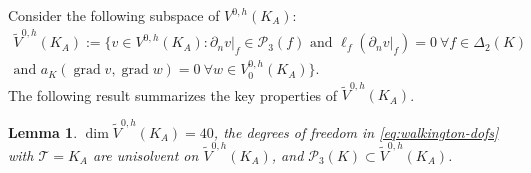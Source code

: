 \documentclass{mcom-l}
\newtheorem{lemma}[theorem]{Lemma}
\theoremstyle{definition}
\theoremstyle{remark}
\numberwithin{equation}{section}
\DeclareMathOperator{\grad}{grad}
\newcommand{\mesh}[0]{\mathcal{T}}
\begin{document}
Consider the following subspace of $V^{0, h}(K_A)$:
\begin{multline}
	\label{eq:local-h2-space-def}
	\tilde{V}^{0, h}(K_A) := \{ v \in V^{0, h}(K_A) :
	\partial_n v|_{f} \in \mathcal{P}_3(f) 
	\text{ and } \ell_f(\partial_n v|_{f}) = 0  
	\ \forall f \in \Delta_2(K) \\
	\text{and } a_K(\grad v, \grad w) = 0 
	\ \forall w \in V^{0, h}_0(K_A) \}.
\end{multline}
The following result summarizes the key properties of $\tilde{V}^{0, h}(K_A)$.
\begin{lemma}
	\label{lem:walkington-dofs-unisolvent}
	$\dim \tilde{V}^{0, h}(K_A) = 40$, 
	the degrees of freedom in \cref{eq:walkington-dofs} with 
	$\mesh = K_A$ are unisolvent
	on $\tilde{V}^{0, h}(K_A)$,
	and $\mathcal{P}_3(K) \subset \tilde{V}^{0, h}(K_A)$.
\end{lemma}
\end{document}
